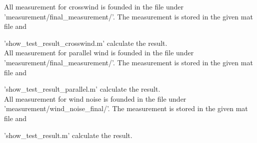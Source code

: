 All measurement for crosswind is founded in the file under 'measurement/final_measurement/'. The measurement is stored in the given mat file and 

'show_test_result_crosswind.m' calculate the result.\\

All measurement for parallel wind is founded in the file under 'measurement/final_measurement/'. The measurement is stored in the given mat file and 

'show_test_result_parallel.m' calculate the result.\\

All measurement for wind noise is founded in the file under 'measurement/wind_noise_final/'. The measurement is stored in the given mat file and 

'show_test_result.m' calculate the result.